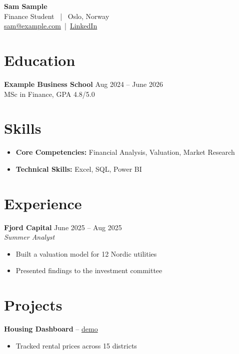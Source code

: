 \documentclass[10pt, a4paper]{article}   %
\newcommand{\expentry}[3]{%
    \noindent\textbf{#1} \hfill {\small #2}\\[-1pt]
    {\small\textit{#3}}\vspace{1pt}%
}
\newcommand{\eduentry}[3]{%
    \noindent\textbf{#1} \hfill {\small #2}\\[-1pt]
    {\small #3}%
}
\begin{document}
\begin{center}
    {\Large\bfseries Sam Sample}\\[2pt]
    {\small Finance Student ~|~ Oslo, Norway}\\[1pt]
    {\small \href{mailto:sam@example.com}{sam@example.com}~|~\href{https://www.linkedin.com/in/sample}{LinkedIn}}
\end{center}

\section{Education}
\eduentry{Example Business School}{Aug 2024 -- June 2026}{MSc in Finance, GPA 4.8/5.0}

\section{Skills}
\begin{itemize}[leftmargin=0in, label={}, itemsep=2pt]
    \item {\small\textbf{Core Competencies:} Financial Analysis, Valuation, Market Research}
    \item {\small\textbf{Technical Skills:} Excel, SQL, Power BI}
\end{itemize}

\section{Experience}
\expentry{Fjord Capital}{June 2025 -- Aug 2025}{Summer Analyst}
\begin{itemize}
    \item Built a valuation model for 12 Nordic utilities
    \item Presented findings to the investment committee
\end{itemize}

\section{Projects}
\noindent\textbf{Housing Dashboard} -- \href{https://example.com/dash}{demo}
\begin{itemize}
    \item Tracked rental prices across 15 districts
\end{itemize}
\end{document}
